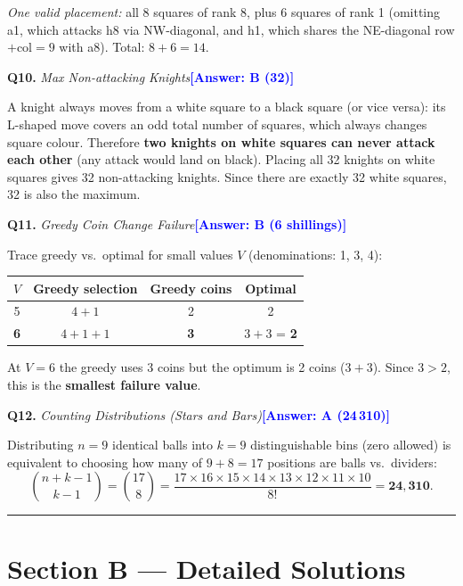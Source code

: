\documentclass[a4paper,12pt]{article}
\newcommand{\ans}[1]{\textcolor{blue}{\textbf{[Answer: #1]}}}
\newcommand{\qsol}[3]{%
  \vspace{1.5ex}%
  \noindent\textbf{Q#1.} \textit{#2}\quad\ans{#3}%
  \par\vspace{0.4ex}%
}
\begin{document}
\emph{One valid placement:} all 8 squares of rank 8, plus 6 squares of rank 1
(omitting a1, which attacks h8 via NW-diagonal, and h1, which shares the
NE-diagonal row$+$col$=9$ with a8). Total: $8+6=14$.

\qsol{10}{Max Non-attacking Knights}{B (32)}

A knight always moves from a white square to a black square (or vice versa):
its L-shaped move covers an odd total number of squares, which always changes
square colour. Therefore \textbf{two knights on white squares can never attack
each other} (any attack would land on black). Placing all 32 knights on white
squares gives 32 non-attacking knights. Since there are exactly 32 white
squares, 32 is also the maximum.

\qsol{11}{Greedy Coin Change Failure}{B (6 shillings)}

Trace greedy vs.\ optimal for small values $V$ (denominations: 1, 3, 4):

\begin{center}
\begin{tabular}{cccc}
\toprule
$V$ & Greedy selection & Greedy coins & Optimal \\
\midrule
5 & $4+1$     & 2 & 2 \\
\textbf{6} & $4+1+1$  & \textbf{3} & $3+3$ = \textbf{2} \\
\bottomrule
\end{tabular}
\end{center}

At $V=6$ the greedy uses 3 coins but the optimum is 2 coins ($3+3$).
Since $3 > 2$, this is the \textbf{smallest failure value}.

\qsol{12}{Counting Distributions (Stars and Bars)}{A (24\,310)}

Distributing $n=9$ identical balls into $k=9$ distinguishable bins
(zero allowed) is equivalent to choosing how many of $9+8=17$ positions
are balls vs.\ dividers:
\[
  \binom{n+k-1}{k-1} = \binom{17}{8}
  = \frac{17\times16\times15\times14\times13\times12\times11\times10}
         {8!}
  = \mathbf{24{,}310}.
\]

\vspace{1ex}\hrule\vspace{2ex}

\section*{Section B --- Detailed Solutions}
\end{document}
